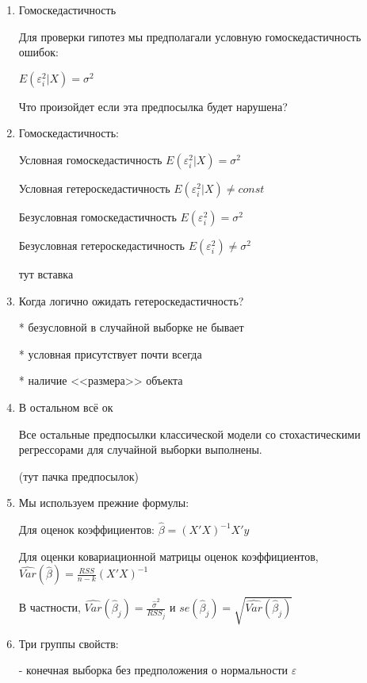 \documentclass[12pt,a4paper]{article}
\begin{document}
{\Huge

\begin{enumerate}

\item Гомоскедастичность

Для проверки гипотез мы предполагали условную гомоскедастичность ошибок:

$ E(\varepsilon_i^2 | X)=\sigma^2 $

Что произойдет если эта предпосылка будет нарушена?

\item Гомоскедастичность:

Условная гомоскедастичность $E(\varepsilon_i^2 | X)=\sigma^2$

Условная гетероскедастичность  $E(\varepsilon_i^2 | X) \neq const$


Безусловная гомоскедастичность $E(\varepsilon_i^2)=\sigma^2$

Безусловная гетероскедастичность $E(\varepsilon_i^2) \neq \sigma^2$



тут вставка


\item Когда логично ожидать гетероскедастичность?

* безусловной в случайной выборке не бывает

* условная присутствует почти всегда

* наличие <<размера>> объекта

\item В остальном всё ок

Все остальные предпосылки классической модели со стохастическими регрессорами для случайной выборки выполнены.

(тут пачка предпосылок)

\newpage
\item  Мы используем прежние формулы:

Для оценок коэффициентов:
$\hat{\beta}=(X'X)^{-1}X'y$

Для оценки ковариационной матрицы оценок коэффициентов,
$\widehat{Var}(\hat{\beta})=\frac{RSS}{n-k}(X'X)^{-1}$

В частности, $\widehat{Var}(\hat{\beta}_j)=\frac{\hat{\sigma}^2}{RSS_j}$
и $se(\hat{\beta}_j)=\sqrt{\widehat{Var}(\hat{\beta}_j)}$


\item Три группы свойств:

- конечная выборка без предположения о нормальности $\varepsilon$


\end{enumerate}}
\end{document}
